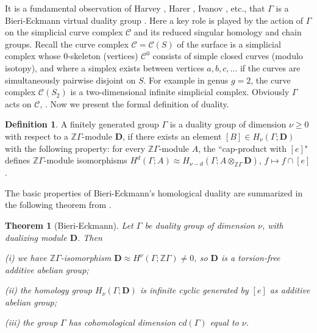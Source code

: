 \documentclass[12pt]{amsart}
\newtheorem*{thmm}{Theorem}
\theoremstyle{definition}
\newtheorem{dfn}[thm]{Definition}
\theoremstyle{remark}
\newcommand{\bZ}{\mathbb{Z}}
\newcommand{\bD}{\textbf{D}}
\newcommand{\sC}{\mathscr{C}}
\newcommand{\sT}{\mathscr{T}}
\begin{document}

It is a fundamental observation of Harvey \cite{Harvey}, Harer \cite{Harer1986}, Ivanov \cite{ivanov2015virtual},  etc., that $\Gamma$ is a Bieri-Eckmann virtual duality group \cite{BiEck}. Here a key role is played by the action of $\Gamma$ on the simplicial curve complex $\sC$ and its reduced singular homology and chain groups. Recall the curve complex $\sC=\sC(S)$ of the surface is a simplicial complex whose $0$-skeleton (vertices) $\sC^0$ consists of simple closed curves (modulo isotopy), and where a simplex exists between vertices $a,b,c,\ldots$ if the curves are simultaneously pairwise disjoint on $S$. For example in genus $g=2$, the curve complex $\sC(S_2)$ is a two-dimensional infinite simplicial complex. Obviously $\Gamma$ acts on $\sC$, \cite{primer}. Now we present the formal definition of duality.


\begin{dfn} 
A finitely generated group $\Gamma$ is a duality group of dimension $\nu \geq 0$ with respect to a $\bZ \Gamma$-module $\bD$, if there exists an element $[B]\in H_\nu(\Gamma; \bD)$ with the following property: for every $\bZ \Gamma$-module $A$, the ``cap-product with $[e]$" defines $\bZ \Gamma$-module isomorphisms $H^d(\Gamma;A) \approx H_{\nu-d}(\Gamma; A \otimes_{\bZ \Gamma} \bD)$, $f\mapsto f\cap [e]$. 
\end{dfn}

The basic properties of Bieri-Eckmann's homological duality are summarized in the following theorem from \cite{BiEck}.
\begin{thmm}[Bieri-Eckmann]\label{dual1}
Let $\Gamma$ be duality group of dimension $\nu$, with dualizing module $\bD$. Then 

(i) we have $\bZ \Gamma$-isomorphism $\bD \approx H^\nu(\Gamma;\bZ \Gamma) \neq 0$, so $\bD$ is a torsion-free additive abelian group;


(ii) the homology group $H_\nu (\Gamma; \bD)$ is infinite cyclic generated by $[e]$ as additive abelian group; 

(iii) the group $\Gamma$ has cohomological dimension $cd(\Gamma)$ equal to $\nu$.
\end{thmm}
\end{document}
